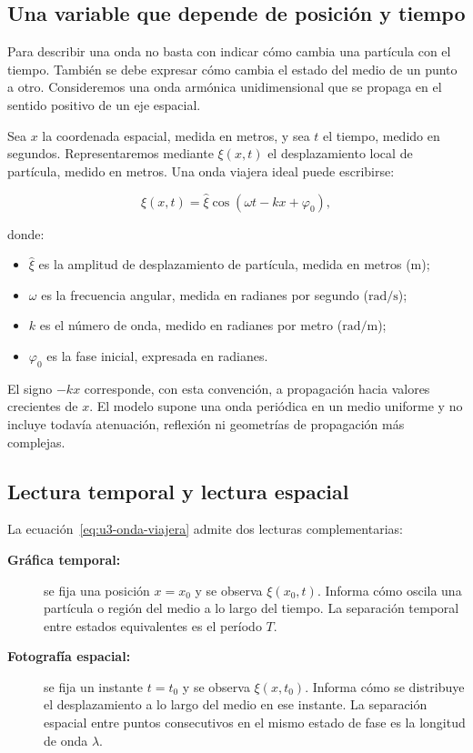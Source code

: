 \subsection{Una variable que depende de posición y tiempo}
\label{sec:u3-onda-x-t}

Para describir una onda no basta con indicar cómo cambia una partícula con el
tiempo. También se debe expresar cómo cambia el estado del medio de un punto a
otro. Consideremos una onda armónica unidimensional que se propaga en el
sentido positivo de un eje espacial.

Sea \(x\) la coordenada espacial, medida en metros, y sea \(t\) el tiempo,
medido en segundos. Representaremos mediante \(\xi(x,t)\) el desplazamiento
local de partícula, medido en metros. Una onda viajera ideal puede escribirse:

\begin{equation}
    \xi(x,t)=\hat{\xi}
        \cos\left(\omega t-kx+\varphi_0\right),
    \label{eq:u3-onda-viajera}
\end{equation}

donde:

\begin{itemize}
    \item \(\hat{\xi}\) es la amplitud de desplazamiento de partícula, medida
    en metros (\(\text{m}\));
    \item \(\omega\) es la frecuencia angular, medida en radianes por segundo
    (\(\text{rad}/\text{s}\));
    \item \(k\) es el número de onda, medido en radianes por metro
    (\(\text{rad}/\text{m}\));
    \item \(\varphi_0\) es la fase inicial, expresada en radianes.
\end{itemize}

El signo \(-kx\) corresponde, con esta convención, a propagación hacia valores
crecientes de \(x\). El modelo supone una onda periódica en un medio uniforme
y no incluye todavía atenuación, reflexión ni geometrías de propagación más
complejas.

\subsection{Lectura temporal y lectura espacial}
\label{sec:u3-tiempo-espacio}

La ecuación~\eqref{eq:u3-onda-viajera} admite dos lecturas complementarias:

\begin{description}
    \item[\textbf{Gráfica temporal:}] se fija una posición \(x=x_0\) y se
    observa \(\xi(x_0,t)\). Informa cómo oscila una partícula o región del
    medio a lo largo del tiempo. La separación temporal entre estados
    equivalentes es el período \(T\).
    \item[\textbf{Fotografía espacial:}] se fija un instante \(t=t_0\) y se
    observa \(\xi(x,t_0)\). Informa cómo se distribuye el desplazamiento a lo
    largo del medio en ese instante. La separación espacial entre puntos
    consecutivos en el mismo estado de fase es la longitud de onda
    \(\lambda\).
\end{description}

